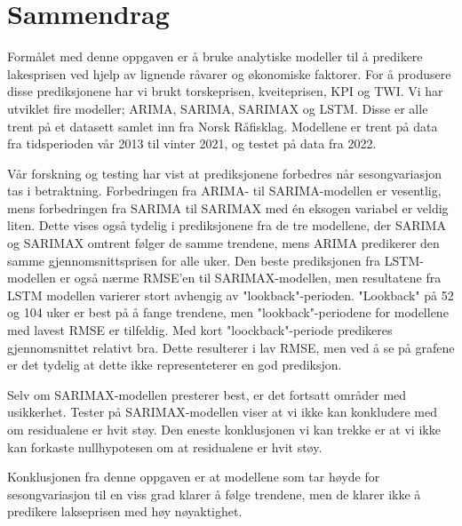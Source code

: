 \section*{Sammendrag}
Formålet med denne oppgaven er å bruke analytiske modeller til å predikere lakesprisen ved hjelp av lignende råvarer og økonomiske faktorer. For å produsere disse prediksjonene har vi brukt torskeprisen, kveiteprisen, KPI og TWI. Vi har utviklet fire modeller; ARIMA, SARIMA, SARIMAX og LSTM. Disse er alle trent på et datasett samlet inn fra Norsk Råfisklag. Modellene er trent på data fra tidsperioden vår 2013 til vinter 2021, og testet på data fra 2022.

Vår forskning og testing har vist at prediksjonene forbedres når sesongvariasjon tas i betraktning. Forbedringen fra ARIMA- til SARIMA-modellen er vesentlig, mens forbedringen fra SARIMA til SARIMAX med én eksogen variabel er veldig liten. Dette vises også tydelig i prediksjonene fra de tre modellene, der SARIMA og SARIMAX omtrent følger de samme trendene, mens ARIMA predikerer den samme gjennomsnittsprisen for alle uker. Den beste prediksjonen fra LSTM-modellen er også nærme RMSE'en til SARIMAX-modellen, men resultatene fra LSTM modellen varierer stort avhengig av "lookback"-perioden. "Lookback" på 52 og 104 uker er best på å fange trendene, men "lookback"-periodene for modellene med lavest RMSE er tilfeldig. Med kort "loockback"-periode predikeres gjennomsnittet relativt bra. Dette resulterer i lav RMSE, men ved å se på grafene er det tydelig at dette ikke representeterer en god prediksjon. 

Selv om SARIMAX-modellen presterer best, er det fortsatt områder med usikkerhet. Tester på SARIMAX-modellen viser at vi ikke kan konkludere med om residualene er hvit støy. Den eneste konklusjonen vi kan trekke er at vi ikke kan forkaste nullhypotesen om at residualene er hvit støy.

Konklusjonen fra denne oppgaven er at modellene som tar høyde for sesongvariasjon til en viss grad klarer å følge trendene, men de klarer ikke å predikere lakseprisen med høy nøyaktighet. 

